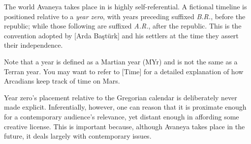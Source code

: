 
\startlines
The world Avaneya takes place in is highly self-referential. A fictional timeline is positioned relative to a {\it year zero}, with years preceding suffixed {\it B.R.}, before the republic; while those following are suffixed {\it A.R.}, after the republic. This is the convention adopted by [Arda Baştürk] and his settlers at the time they assert their independence.

Note that a year is defined as a Martian year (MYr) and is not the same as a Terran year. You may want to refer to [Time] for a detailed explanation of how Arcadians keep track of time on Mars.

Year zero's placement relative to the Gregorian calendar is deliberately never made explicit. Inferentially, however, one can reason that it is proximate enough for a contemporary audience's relevance, yet distant enough in affording some creative license. This is important because, although Avaneya takes place in the future, it deals largely with contemporary issues.
\crlf

\page 
\page 
\page 
\page 
\page 
\page 
\page 

\stoplines

\StopChapter

